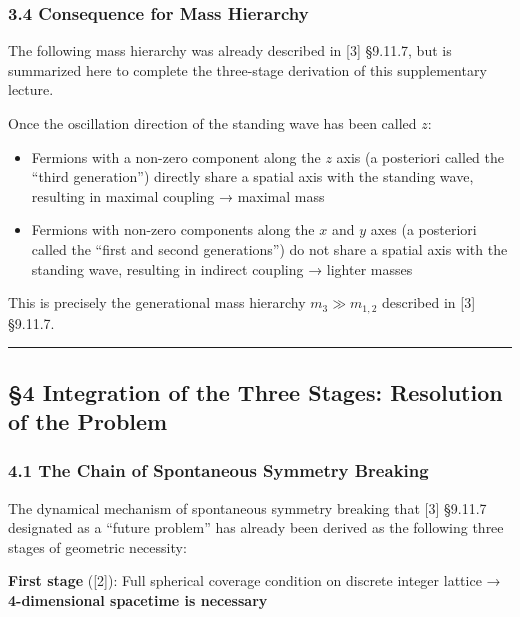 \documentclass[
  a4paper,11pt]{article}
\providecommand{\tightlist}{%
  \setlength{\itemsep}{0pt}\setlength{\parskip}{0pt}}
\begin{document}
\subsubsection{3.4 Consequence for Mass
Hierarchy}\label{consequence-for-mass-hierarchy}

The following mass hierarchy was already described in {[}3{]} §9.11.7,
but is summarized here to complete the three-stage derivation of this
supplementary lecture.

Once the oscillation direction of the standing wave has been called
\(z\):

\begin{itemize}
\tightlist
\item
  Fermions with a non-zero component along the \(z\) axis (a posteriori
  called the ``third generation'') directly share a spatial axis with
  the standing wave, resulting in maximal coupling → maximal mass
\item
  Fermions with non-zero components along the \(x\) and \(y\) axes (a
  posteriori called the ``first and second generations'') do not share a
  spatial axis with the standing wave, resulting in indirect coupling →
  lighter masses
\end{itemize}

This is precisely the generational mass hierarchy \(m_3 \gg m_{1,2}\)
described in {[}3{]} §9.11.7.

\begin{center}\rule{0.5\linewidth}{0.5pt}\end{center}

\subsection{§4 Integration of the Three Stages: Resolution of the
Problem}\label{integration-of-the-three-stages-resolution-of-the-problem}

\subsubsection{4.1 The Chain of Spontaneous Symmetry
Breaking}\label{the-chain-of-spontaneous-symmetry-breaking}

The dynamical mechanism of spontaneous symmetry breaking that {[}3{]}
§9.11.7 designated as a ``future problem'' has already been derived as
the following three stages of geometric necessity:

\textbf{First stage} ({[}2{]}): Full spherical coverage condition on
discrete integer lattice → \textbf{4-dimensional spacetime is necessary}
\end{document}
